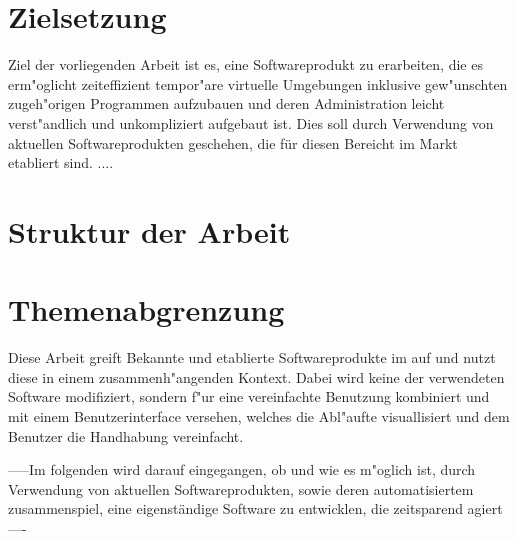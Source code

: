 \section{Zielsetzung}
Ziel der vorliegenden Arbeit ist es, eine Softwareprodukt zu erarbeiten, die es erm"oglicht zeiteffizient tempor"are virtuelle Umgebungen inklusive gew"unschten zugeh"origen Programmen aufzubauen und deren Administration leicht verst"andlich und unkompliziert aufgebaut ist.
Dies soll durch Verwendung von aktuellen Softwareprodukten geschehen, die für diesen Bereicht im Markt etabliert sind.\newline
....

\section{Struktur der Arbeit}

\section{Themenabgrenzung}
Diese Arbeit greift Bekannte und etablierte Softwareprodukte im auf und nutzt diese in einem zusammenh"angenden Kontext. Dabei wird keine der verwendeten Software modifiziert, sondern f"ur eine vereinfachte Benutzung kombiniert und mit einem Benutzerinterface versehen, welches die Abl"aufte visuallisiert und dem Benutzer die Handhabung vereinfacht.


-----Im folgenden wird darauf eingegangen, ob und wie es m"oglich ist, durch Verwendung von aktuellen Softwareprodukten, sowie deren automatisiertem zusammenspiel, eine eigenständige Software zu entwicklen, die zeitsparend agiert----










